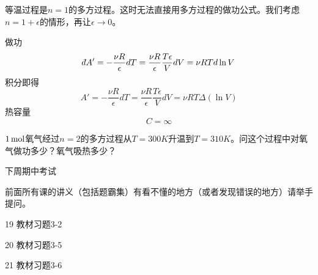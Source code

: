 \documentclass[CJK]{beamer}
\begin{document}
\begin{frame}
\bch
\bex
等温过程是$n=1$的多方过程。这时无法直接用多方过程的做功公式。我们考虑$n=1+\epsilon$的情形，再让$\epsilon \rightarrow 0$。

做功
$$\dbar A' = -\frac{\nu R}{\epsilon}dT = \frac{\nu R}{\epsilon}\frac{T\epsilon}{V}dV = \nu RT d\ln V $$
积分即得
$$ A' = -\frac{\nu R}{\epsilon}dT = \frac{\nu R}{\epsilon}\frac{T\epsilon}{V}dV = \nu RT \Delta(\ln V) $$
热容量
$$C = \infty $$

\eex
\ech
\end{frame}


\begin{frame}
\bch
{}
$1\,\mathrm{mol}$氧气经过$n=2$的多方过程从$T=300K$升温到$T=310K$。问这个过程中对氧气做功多少？氧气吸热多少？
\ech
\end{frame}


\begin{frame}
\bch

下周期中考试


前面所有课的讲义（包括题霸集）有看不懂的地方（或者发现错误的地方）请举手提问。


\ech
\end{frame}


\begin{frame}
\bch
\bitem
\item[19]{教材习题3-2}
\item[20]{教材习题3-5}
\item[21]{教材习题3-6}
\eitem
\ech
\end{frame}
\end{document}
